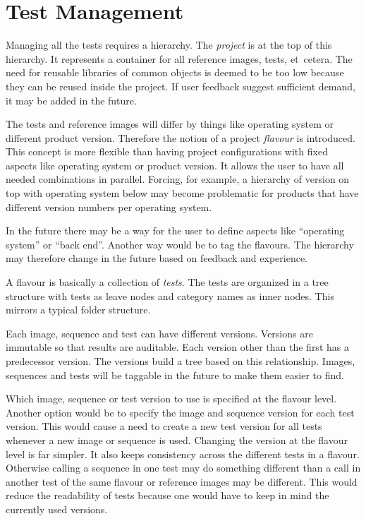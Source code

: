 \documentclass[a4paper,twocolumn,twoside]{article}
\begin{document}
\section{Test Management}
Managing all the tests requires a hierarchy.
The \emph{project} is at the top of this hierarchy.
It represents a container for all reference images, tests, et~cetera.
The need for reusable libraries of common objects is deemed to be too low because they can be reused inside the project.
If user feedback suggest sufficient demand, it may be added in the future.

The tests and reference images will differ by things like operating system or different product version.
Therefore the notion of a project \emph{flavour} is introduced.
This concept is more flexible than having project configurations with fixed aspects like operating system or product version.
It allows the user to have all needed combinations in parallel.
Forcing, for example, a hierarchy of version on top with operating system below may become problematic for products that have different version numbers per operating system.

In the future there may be a way for the user to define aspects like \enquote{operating system} or \enquote{back end}.
Another way would be to tag the flavours.
The hierarchy may therefore change in the future based on feedback and experience.

A flavour is basically a collection of \emph{tests}.
The tests are organized in a tree structure with tests as leave nodes and category names as inner nodes.
This mirrors a typical folder structure.

Each image, sequence and test can have different versions.
Versions are immutable so that results are auditable.
Each version other than the first has a predecessor version.
The versions build a tree based on this relationship.
Images, sequences and tests will be taggable in the future to make them easier to find.

Which image, sequence or test version to use is specified at the flavour level.
Another option would be to specify the image and sequence version for each test version.
This would cause a need to create a new test version for all tests whenever a new image or sequence is used.
Changing the version at the flavour level is far simpler.
It also keeps consistency across the different tests in a flavour.
Otherwise calling a sequence in one test may do something different than a call in another test of the same flavour or reference images may be different.
This would reduce the readability of tests because one would have to keep in mind the currently used versions.
\end{document}
